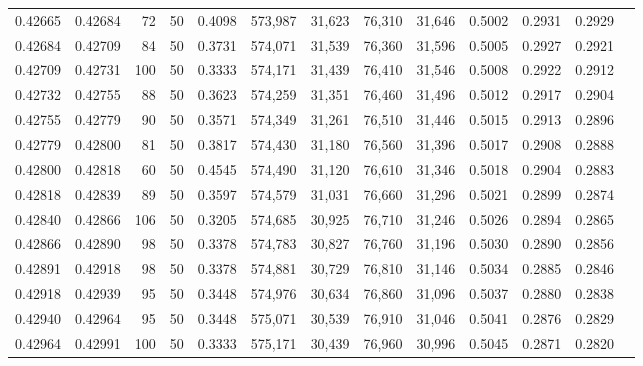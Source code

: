 \begin{tabular}{rrrrrrrrrrrrr}
0.42665 & 0.42684 &    72 &  50 &                                     0.4098 & 573,987 &  31,623 &  76,310 &  31,646 & 0.5002 & 0.2931 & 0.2929 \\
0.42684 & 0.42709 &    84 &  50 &                                     0.3731 & 574,071 &  31,539 &  76,360 &  31,596 & 0.5005 & 0.2927 & 0.2921 \\
0.42709 & 0.42731 &   100 &  50 &                                     0.3333 & 574,171 &  31,439 &  76,410 &  31,546 & 0.5008 & 0.2922 & 0.2912 \\
0.42732 & 0.42755 &    88 &  50 &                                     0.3623 & 574,259 &  31,351 &  76,460 &  31,496 & 0.5012 & 0.2917 & 0.2904 \\
0.42755 & 0.42779 &    90 &  50 &                                     0.3571 & 574,349 &  31,261 &  76,510 &  31,446 & 0.5015 & 0.2913 & 0.2896 \\
0.42779 & 0.42800 &    81 &  50 &                                     0.3817 & 574,430 &  31,180 &  76,560 &  31,396 & 0.5017 & 0.2908 & 0.2888 \\
0.42800 & 0.42818 &    60 &  50 &                                     0.4545 & 574,490 &  31,120 &  76,610 &  31,346 & 0.5018 & 0.2904 & 0.2883 \\
0.42818 & 0.42839 &    89 &  50 &                                     0.3597 & 574,579 &  31,031 &  76,660 &  31,296 & 0.5021 & 0.2899 & 0.2874 \\
0.42840 & 0.42866 &   106 &  50 &                                     0.3205 & 574,685 &  30,925 &  76,710 &  31,246 & 0.5026 & 0.2894 & 0.2865 \\
0.42866 & 0.42890 &    98 &  50 &                                     0.3378 & 574,783 &  30,827 &  76,760 &  31,196 & 0.5030 & 0.2890 & 0.2856 \\
0.42891 & 0.42918 &    98 &  50 &                                     0.3378 & 574,881 &  30,729 &  76,810 &  31,146 & 0.5034 & 0.2885 & 0.2846 \\
0.42918 & 0.42939 &    95 &  50 &                                     0.3448 & 574,976 &  30,634 &  76,860 &  31,096 & 0.5037 & 0.2880 & 0.2838 \\
0.42940 & 0.42964 &    95 &  50 &                                     0.3448 & 575,071 &  30,539 &  76,910 &  31,046 & 0.5041 & 0.2876 & 0.2829 \\
0.42964 & 0.42991 &   100 &  50 &                                     0.3333 & 575,171 &  30,439 &  76,960 &  30,996 & 0.5045 & 0.2871 & 0.2820 \\

\end{tabular}
